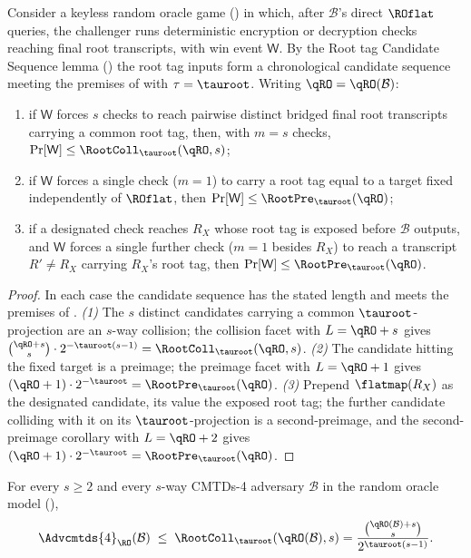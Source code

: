 \begin{lemma}
\label{lem:root-tag-hash}
Consider a keyless \TW{} random oracle game () in
which, after $\mathcal{B}$'s direct $\ROflat$ queries, the challenger runs
deterministic encryption or decryption checks reaching final root
transcripts, with win event $\mathsf{W}$. By the Root tag Candidate
Sequence lemma () the root tag inputs form a
chronological candidate sequence meeting the premises of
 with $\tau = \tauroot$. Writing
$\qRO = \qRO(\mathcal{B})$:
\begin{enumerate}
\item if $\mathsf{W}$ forces $s$ checks to reach pairwise distinct bridged
  final root transcripts carrying a common root tag, then, with $m = s$
  checks, $\Pr[\mathsf{W}] \leq \RootColl_{\tauroot}(\qRO, s)$;
\item if $\mathsf{W}$ forces a single check ($m = 1$) to carry a root tag
  equal to a target fixed independently of $\ROflat$, then
  $\Pr[\mathsf{W}] \leq \RootPre_{\tauroot}(\qRO)$;
\item if a designated check reaches $R_X$ whose root tag is exposed before
  $\mathcal{B}$ outputs, and $\mathsf{W}$ forces a single further check
  ($m = 1$ besides $R_X$) to reach a transcript $R' \neq R_X$ carrying
  $R_X$'s root tag, then $\Pr[\mathsf{W}] \leq \RootPre_{\tauroot}(\qRO)$.
\end{enumerate}
\end{lemma}

\begin{proof}
In each case the candidate sequence has the stated length and meets the
premises of .
\emph{(1)} The $s$ distinct candidates carrying a common
$\tauroot$-projection are an $s$-way collision; the collision facet with
$L = \qRO + s$ gives
$\binom{\qRO + s}{s} \cdot 2^{-\tauroot(s-1)} = \RootColl_{\tauroot}(\qRO, s)$.
\emph{(2)} The candidate hitting the fixed target is a preimage; the
preimage facet with $L = \qRO + 1$ gives
$(\qRO + 1) \cdot 2^{-\tauroot} = \RootPre_{\tauroot}(\qRO)$.
\emph{(3)} Prepend $\flatmap(R_X)$ as the designated candidate, its value
the exposed root tag; the further candidate colliding with it on its
$\tauroot$-projection is a second-preimage, and the second-preimage
corollary with $L = \qRO + 2$ gives
$(\qRO + 1) \cdot 2^{-\tauroot} = \RootPre_{\tauroot}(\qRO)$.
\end{proof}

\begin{theorem}
\label{thm:cmtds4-ro}
For every $s \geq 2$ and every $s$-way CMTDs-4
adversary $\mathcal{B}$ in the \TW{} random oracle model
(),
\[
  \Advcmtds{4}_\RO(\mathcal{B})
  \;\leq\; \RootColl_{\tauroot}(\qRO(\mathcal{B}), s)
  = \frac{\binom{\qRO(\mathcal{B}) + s}{s}}{2^{\tauroot (s - 1)}}.
\]
\end{theorem}

